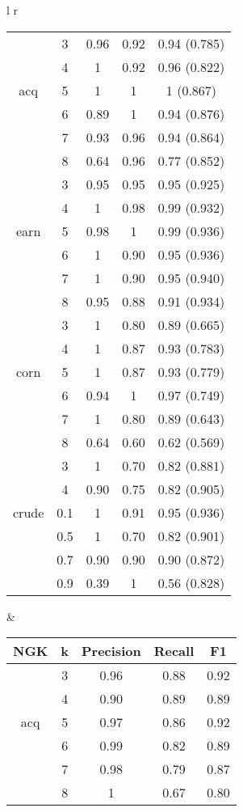 \begin{tabular}{l r}
\begin{tabular}{| c | c | c | c | c | }
	& 3 & 0.96 & 0.92 & 0.94 (0.785)    \\ 
	& 4 & 1 & 0.92 & 0.96 (0.822)    \\ 
	acq & 5 & 1& 1 &  1 (0.867)   \\
	& 6 & 0.89 & 1 & 0.94 (0.876)    \\ 
	& 7 & 0.93 & 0.96 & 0.94   (0.864)  \\ 
	& 8 & 0.64 & 0.96 & 0.77  (0.852)   \\ \hline
	
	
	& 3 & 0.95 & 0.95 &  0.95  (0.925)  \\	
	& 4 & 1 & 0.98 &  0.99  (0.932)  \\ 
	earn & 5 & 0.98 & 1 &  0.99 (0.936)   \\ 
	& 6 & 1 & 0.90 &  0.95  (0.936)  \\ 
	& 7 & 1 & 0.90 &  0.95  (0.940)  \\
	& 8 & 0.95 & 0.88 &  0.91  (0.934)  \\\hline
	
	
	
	& 3 & 1 & 0.80 & 0.89  (0.665)   \\ 
	& 4 & 1 & 0.87 & 0.93   (0.783)  \\ 
	corn & 5 & 1 & 0.87 & 0.93   (0.779)  \\ 
	& 6 & 0.94 & 1 &  0.97  (0.749) \\ 
	& 7 & 1 & 0.80 & 0.89   (0.643)  \\ 
	& 8 & 0.64 & 0.60 & 0.62  (0.569)   \\ \hline
	
	
	& 3 & 1 & 0.70 &  0.82  (0.881)  \\
	& 4 & 0.90 & 0.75 &  0.82  (0.905)  \\ 
	crude & 0.1 & 1 & 0.91 & 0.95  (0.936)   \\ 
	& 0.5 & 1 & 0.70 &  0.82 (0.901)   \\ 
	& 0.7 & 0.90 & 0.90 &  0.90   (0.872) \\
	& 0.9 & 0.39 & 1 &  0.56  (0.828)  \\\hline
	
	
\end{tabular}

&

\begin{tabular}{| c | c | c | c | c | }
	\hline NGK & k & Precision & Recall & F1   \\ \hline
	
	& 3 & 0.96 & 0.88 & 0.92     \\ 
	& 4 & 0.90 & 0.89 &  0.89    \\
	acq	& 5 & 0.97 & 0.86 & 0.92     \\ 
	& 6 & 0.99 & 0.82 & 0.89     \\
	& 7 & 0.98 & 0.79 & 0.87     \\
	& 8 & 1 & 0.67 & 0.80     \\
	\hline
	

\end{tabular}
\end{tabular}
